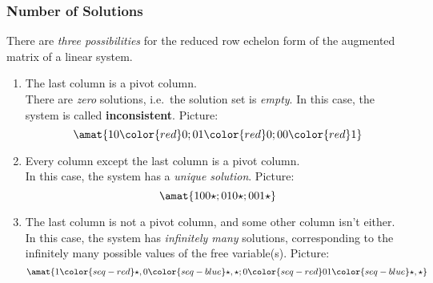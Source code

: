 \begin{frame}
\frametitle{Number of Solutions}

There are \emph{three possibilities} for the reduced row echelon form of the
augmented matrix of a linear system.\pause

\begin{enumerate}
\item \alert{The last column is a pivot column.}\\
  \pause
  There are \emph{zero} solutions, i.e.\ the solution set is \emph{empty}.
  \pause
  In this case, the system is called \textbf{inconsistent}.  
  Picture:
  \pause
  \[ \amat{ 1 0 {\color{red}0}; 0 1 {\color{red}0}; 0 0 {\color{red}1}} \]

\pause
\item \alert{Every column except the last column is a pivot column.}\\
  In this case, the system has a \emph{unique solution}.  Picture:
  \[ \amat{
      1  0  0  \star ;
      0  1  0  \star ;
      0  0  1  \star
    } \]
%

\pause
\item \alert{The last column is not a pivot column, and some other column isn't either.}\\
  In this case, the system has \emph{infinitely many} solutions, corresponding
  to the infinitely many possible values of the free variable(s).  Picture:
  \[\amat{
      1  \color{seq-red}\star,  0  \color{seq-blue}\star,  \star ;
      0  \color{seq-red}0   1  \color{seq-blue}\star, \star
    }\]

\end{enumerate}

\end{frame}



